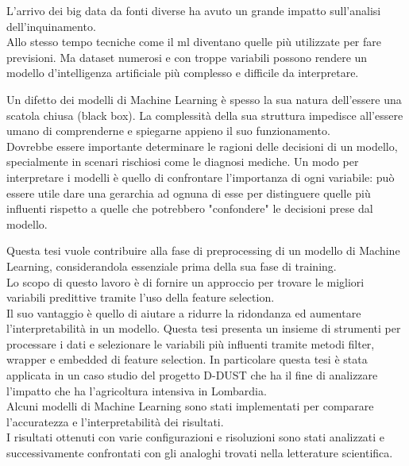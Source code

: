 L'arrivo dei big data da fonti diverse ha avuto un grande impatto sull'analisi dell'inquinamento.\\
Allo stesso tempo tecniche come il \gls{ml} diventano quelle più utilizzate per fare previsioni.
Ma dataset numerosi e con troppe variabili possono rendere un modello d'intelligenza artificiale più complesso e difficile da interpretare.\par
Un difetto dei modelli di Machine Learning è spesso la sua natura dell'essere una scatola chiusa (black box). La complessità della sua struttura impedisce all'essere umano di comprenderne e spiegarne appieno il suo funzionamento.\\
Dovrebbe essere importante determinare le ragioni delle decisioni di un modello, specialmente in scenari rischiosi come le diagnosi mediche.
Un modo per interpretare i modelli è quello di confrontare l'importanza di ogni variabile: può essere utile dare una gerarchia ad ognuna di esse per distinguere quelle più influenti rispetto a quelle che potrebbero "confondere" le decisioni prese dal modello. \par
Questa tesi vuole contribuire alla fase di preprocessing di un modello di Machine Learning, considerandola essenziale prima della sua fase di training.\\
Lo scopo di questo lavoro è di fornire un approccio per trovare le migliori variabili predittive tramite l'uso della feature selection. \\
Il suo vantaggio è quello di aiutare a ridurre la ridondanza ed aumentare l'interpretabilità in un modello.
Questa tesi presenta un insieme di strumenti per processare i dati e selezionare le variabili più influenti tramite metodi filter, wrapper e embedded di feature selection.
In particolare questa tesi è stata applicata in un caso studio del progetto D-DUST che ha il fine di analizzare l'impatto che ha l'agricoltura intensiva in Lombardia.\\ 
Alcuni modelli di Machine Learning sono stati implementati per comparare l'accuratezza e l'interpretabilità dei risultati.\\
I risultati ottenuti con varie configurazioni e risoluzioni sono stati analizzati e successivamente confrontati con gli analoghi trovati nella letterature scientifica.
\\
